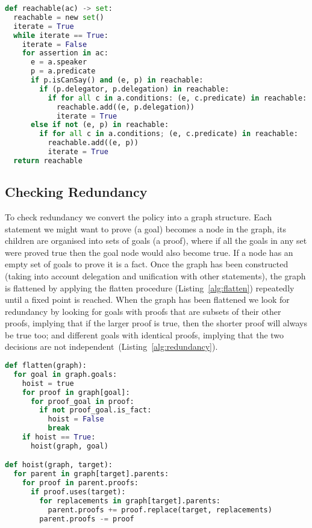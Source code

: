 \documentclass[a4paper]{article}
\begin{document}
\begin{lstlisting}[language=Python,float,caption={Procedure for finding all reachable assertions.},label={alg:reachable}]
def reachable(ac) -> set:
  reachable = new set()
  iterate = True
  while iterate == True:
    iterate = False
    for assertion in ac:
      e = a.speaker
      p = a.predicate
      if p.isCanSay() and (e, p) in reachable:
        if (p.delegator, p.delegation) in reachable:
          if for all c in a.conditions: (e, c.predicate) in reachable:
            reachable.add((e, p.delegation))
            iterate = True
      else if not (e, p) in reachable:
        if for all c in a.conditions; (e, c.predicate) in reachable:
          reachable.add((e, p))
          iterate = True
  return reachable
\end{lstlisting}

\subsection{Checking Redundancy}

To check redundancy we convert the policy into a graph structure.
Each statement we might want to prove (a goal) becomes a node in the graph, its children are organised into sets of goals (a proof), where if all the goals in any set were proved true then the goal node would also become true.
If a node has an empty set of goals to prove it is a fact.
Once the graph has been constructed (taking into account delegation and unification with other statements), the graph is flattened by applying the flatten procedure (Listing~\ref{alg:flatten}) repeatedly until a fixed point is reached.
When the graph has been flattened we look for redundancy by looking for goals with proofs that are subsets of their other proofs, implying that if the larger proof is true, then the shorter proof will always be true too; 
  and different goals with identical proofs, implying that the two decisions are not independent~(Listing~\ref{alg:redundancy}).

\begin{lstlisting}[language=Python,float,caption={Procedure for flattening the redundancy graph.},label={alg:flatten}]
def flatten(graph):
  for goal in graph.goals:
    hoist = true
    for proof in graph[goal]:
      for proof_goal in proof:
        if not proof_goal.is_fact:
          hoist = False
          break
    if hoist == True:
      hoist(graph, goal)

def hoist(graph, target):
  for parent in graph[target].parents:
    for proof in parent.proofs:
      if proof.uses(target):
        for replacements in graph[target].parents:
          parent.proofs += proof.replace(target, replacements)
        parent.proofs -= proof
\end{lstlisting}
\end{document}
